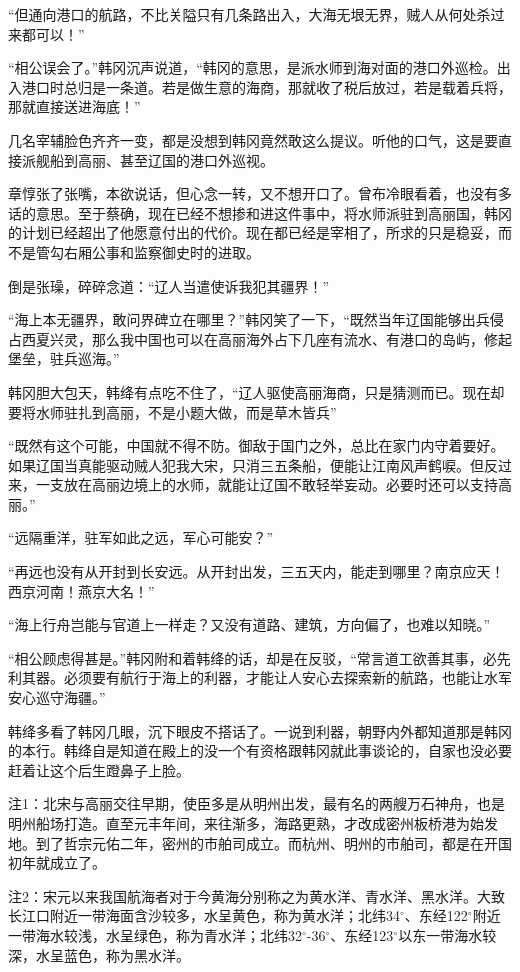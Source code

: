 “但通向港口的航路，不比关隘只有几条路出入，大海无垠无界，贼人从何处杀过来都可以！”

“相公误会了。”韩冈沉声说道，“韩冈的意思，是派水师到海对面的港口外巡检。出入港口时总归是一条道。若是做生意的海商，那就收了税后放过，若是载着兵将，那就直接送进海底！”

几名宰辅脸色齐齐一变，都是没想到韩冈竟然敢这么提议。听他的口气，这是要直接派舰船到高丽、甚至辽国的港口外巡视。

章惇张了张嘴，本欲说话，但心念一转，又不想开口了。曾布冷眼看着，也没有多话的意思。至于蔡确，现在已经不想掺和进这件事中，将水师派驻到高丽国，韩冈的计划已经超出了他愿意付出的代价。现在都已经是宰相了，所求的只是稳妥，而不是管勾右厢公事和监察御史时的进取。

倒是张璪，碎碎念道：“辽人当遣使诉我犯其疆界！”

“海上本无疆界，敢问界碑立在哪里？”韩冈笑了一下，“既然当年辽国能够出兵侵占西夏兴灵，那么我中国也可以在高丽海外占下几座有流水、有港口的岛屿，修起堡垒，驻兵巡海。”

韩冈胆大包天，韩绛有点吃不住了，“辽人驱使高丽海商，只是猜测而已。现在却要将水师驻扎到高丽，不是小题大做，而是草木皆兵”

“既然有这个可能，中国就不得不防。御敌于国门之外，总比在家门内守着要好。如果辽国当真能驱动贼人犯我大宋，只消三五条船，便能让江南风声鹤唳。但反过来，一支放在高丽边境上的水师，就能让辽国不敢轻举妄动。必要时还可以支持高丽。”

“远隔重洋，驻军如此之远，军心可能安？”

“再远也没有从开封到长安远。从开封出发，三五天内，能走到哪里？南京应天！西京河南！燕京大名！”

“海上行舟岂能与官道上一样走？又没有道路、建筑，方向偏了，也难以知晓。”

“相公顾虑得甚是。”韩冈附和着韩绛的话，却是在反驳，“常言道工欲善其事，必先利其器。必须要有航行于海上的利器，才能让人安心去探索新的航路，也能让水军安心巡守海疆。”

韩绛多看了韩冈几眼，沉下眼皮不搭话了。一说到利器，朝野内外都知道那是韩冈的本行。韩绛自是知道在殿上的没一个有资格跟韩冈就此事谈论的，自家也没必要赶着让这个后生蹬鼻子上脸。

注1：北宋与高丽交往早期，使臣多是从明州出发，最有名的两艘万石神舟，也是明州船场打造。直至元丰年间，来往渐多，海路更熟，才改成密州板桥港为始发地。到了哲宗元佑二年，密州的市舶司成立。而杭州、明州的市舶司，都是在开国初年就成立了。

注2：宋元以来我国航海者对于今黄海分别称之为黄水洋、青水洋、黑水洋。大致长江口附近一带海面含沙较多，水呈黄色，称为黄水洋；北纬34\ensuremath{^{\circ}}、东经122\ensuremath{^{\circ}}附近一带海水较浅，水呈绿色，称为青水洋；北纬32\ensuremath{^{\circ}}-36\ensuremath{^{\circ}}、东经123\ensuremath{^{\circ}}以东一带海水较深，水呈蓝色，称为黑水洋。

